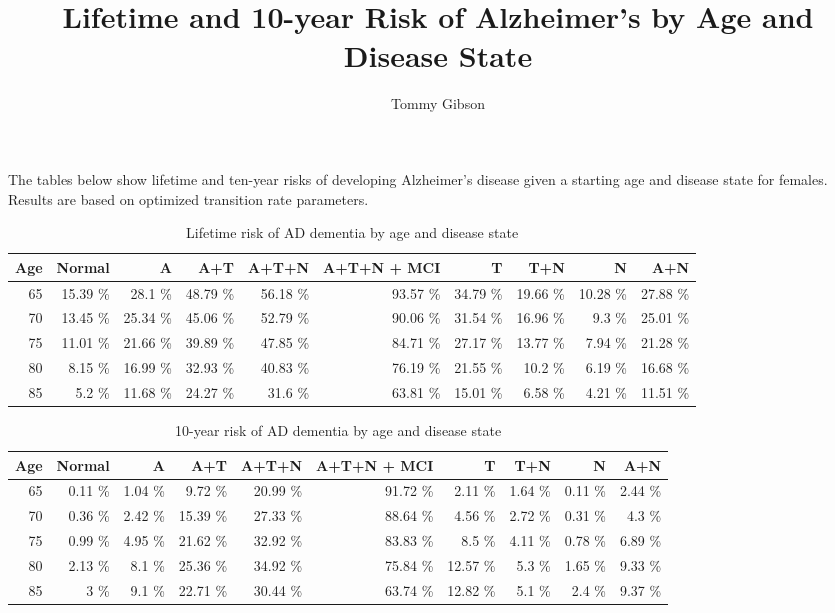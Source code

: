 \documentclass[11pt, oneside]{article}   	%
\title{Lifetime and 10-year Risk of Alzheimer's by Age and Disease State}
\author{Tommy Gibson}
\begin{document}
\maketitle
The tables below show lifetime and ten-year risks of developing Alzheimer's disease given a starting age and disease state for females. Results are based on optimized transition rate parameters. 

\begin{table}[ht]
\centering
\caption{Lifetime risk of AD dementia by age and disease state} 
\begin{tabular}{rrrrrrrrrr}
  \hline
Age & Normal & A & A+T & A+T+N & A+T+N + MCI & T & T+N & N & A+N \\ 
  \hline
65 & 15.39 \% & 28.1 \% & 48.79 \% & 56.18 \% & 93.57 \% & 34.79 \% & 19.66 \% & 10.28 \% & 27.88 \% \\ 
  70 & 13.45 \% & 25.34 \% & 45.06 \% & 52.79 \% & 90.06 \% & 31.54 \% & 16.96 \% & 9.3 \% & 25.01 \% \\ 
  75 & 11.01 \% & 21.66 \% & 39.89 \% & 47.85 \% & 84.71 \% & 27.17 \% & 13.77 \% & 7.94 \% & 21.28 \% \\ 
  80 & 8.15 \% & 16.99 \% & 32.93 \% & 40.83 \% & 76.19 \% & 21.55 \% & 10.2 \% & 6.19 \% & 16.68 \% \\ 
  85 & 5.2 \% & 11.68 \% & 24.27 \% & 31.6 \% & 63.81 \% & 15.01 \% & 6.58 \% & 4.21 \% & 11.51 \% \\ 
   \hline
\end{tabular}
\end{table}

\begin{table}[ht]
\centering
\caption{10-year risk of AD dementia by age and disease state} 
\begin{tabular}{rrrrrrrrrr}
  \hline
Age & Normal & A & A+T & A+T+N & A+T+N + MCI & T & T+N & N & A+N \\ 
  \hline
65 & 0.11 \% & 1.04 \% & 9.72 \% & 20.99 \% & 91.72 \% & 2.11 \% & 1.64 \% & 0.11 \% & 2.44 \% \\ 
  70 & 0.36 \% & 2.42 \% & 15.39 \% & 27.33 \% & 88.64 \% & 4.56 \% & 2.72 \% & 0.31 \% & 4.3 \% \\ 
  75 & 0.99 \% & 4.95 \% & 21.62 \% & 32.92 \% & 83.83 \% & 8.5 \% & 4.11 \% & 0.78 \% & 6.89 \% \\ 
  80 & 2.13 \% & 8.1 \% & 25.36 \% & 34.92 \% & 75.84 \% & 12.57 \% & 5.3 \% & 1.65 \% & 9.33 \% \\ 
  85 & 3 \% & 9.1 \% & 22.71 \% & 30.44 \% & 63.74 \% & 12.82 \% & 5.1 \% & 2.4 \% & 9.37 \% \\ 
   \hline
\end{tabular}
\end{table}
\end{document}
